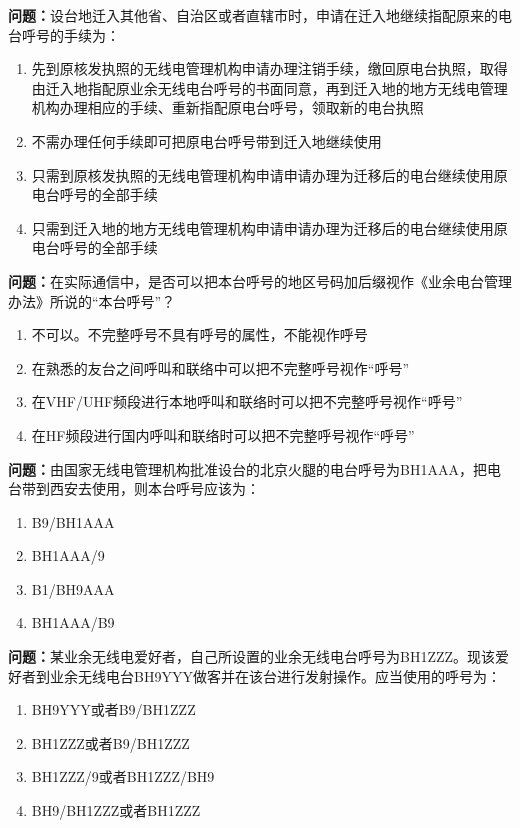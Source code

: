 \bigskip


\noindent\textbf{问题：}设台地迁入其他省、自治区或者直辖市时，申请在迁入地继续指配原来的电台呼号的手续为：
\begin{enumerate}[label=\Alph*), leftmargin=3em]
\item 先到原核发执照的无线电管理机构申请办理注销手续，缴回原电台执照，取得由迁入地指配原业余无线电台呼号的书面同意，再到迁入地的地方无线电管理机构办理相应的手续、重新指配原电台呼号，领取新的电台执照
\item 不需办理任何手续即可把原电台呼号带到迁入地继续使用
\item 只需到原核发执照的无线电管理机构申请申请办理为迁移后的电台继续使用原电台呼号的全部手续
\item 只需到迁入地的地方无线电管理机构申请申请办理为迁移后的电台继续使用原电台呼号的全部手续
\end{enumerate}

\bigskip


\noindent\textbf{问题：}在实际通信中，是否可以把本台呼号的地区号码加后缀视作《业余电台管理办法》所说的“本台呼号”？
\begin{enumerate}[label=\Alph*), leftmargin=3em]
\item 不可以。不完整呼号不具有呼号的属性，不能视作呼号
\item 在熟悉的友台之间呼叫和联络中可以把不完整呼号视作“呼号”
\item 在VHF/UHF频段进行本地呼叫和联络时可以把不完整呼号视作“呼号”
\item 在HF频段进行国内呼叫和联络时可以把不完整呼号视作“呼号”
\end{enumerate}

\bigskip


\noindent\textbf{问题：}由国家无线电管理机构批准设台的北京火腿的电台呼号为BH1AAA，把电台带到西安去使用，则本台呼号应该为：
\begin{enumerate}[label=\Alph*), leftmargin=3em]
\item B9/BH1AAA
\item BH1AAA/9
\item B1/BH9AAA
\item BH1AAA/B9
\end{enumerate}

\bigskip


\noindent\textbf{问题：}某业余无线电爱好者，自己所设置的业余无线电台呼号为BH1ZZZ。现该爱好者到业余无线电台BH9YYY做客并在该台进行发射操作。应当使用的呼号为：
\begin{enumerate}[label=\Alph*), leftmargin=3em]
\item BH9YYY或者B9/BH1ZZZ
\item BH1ZZZ或者B9/BH1ZZZ
\item BH1ZZZ/9或者BH1ZZZ/BH9
\item BH9/BH1ZZZ或者BH1ZZZ
\end{enumerate}

